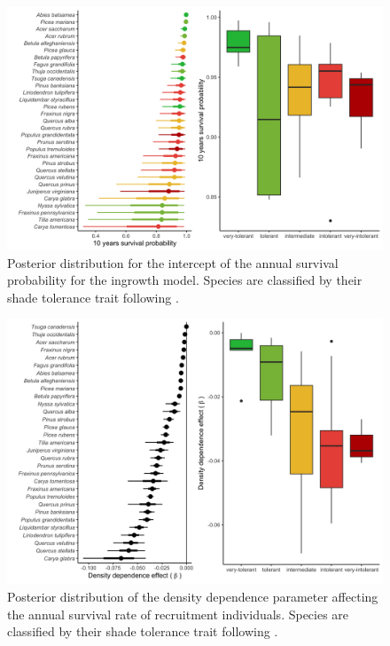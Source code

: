 \newpage

\hypertarget{fig:figsupp4_ch2}{%
\begin{figure}
\centering
\includegraphics{manuscript/figs/fig-intcerpt_ingP-1.png}
\caption[{Posterior distribution for the intercept of the annual
survival probability for the ingrowth model.}]{Posterior distribution
for the intercept of the annual survival probability for the ingrowth
model. Species are classified by their shade tolerance trait following
\citet{burns1990silvics}.}
\label{fig:figsupp4_ch2}
\end{figure}
}

\newpage

\hypertarget{fig:figsupp5_ch2}{%
\begin{figure}
\centering
\includegraphics{manuscript/figs/fig-compRec-1.png}
\caption[{Posterior distribution of the density dependence parameter
affecting the annual survival rate of recruitment
individuals.}]{Posterior distribution of the density dependence
parameter affecting the annual survival rate of recruitment individuals.
Species are classified by their shade tolerance trait following
\citet{burns1990silvics}.}
\label{fig:figsupp5_ch2}
\end{figure}
}

